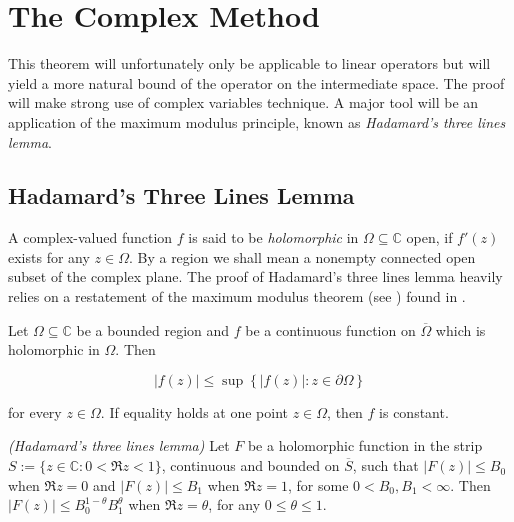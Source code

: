 \section{The Complex Method}
This theorem will unfortunately only be applicable to linear operators but will yield a more natural bound of the operator on the intermediate space. The proof will make strong use of complex variables technique. A major tool will be an application of the maximum modulus principle, known as \emph{Hadamard's three lines lemma}.

\subsection{Hadamard's Three Lines Lemma}
A complex-valued function $f$ is said to be \emph{holomorphic} in $\Omega \subseteq \mathbb{C}$ open, if $f'(z)$ exists for any $z \in \Omega$. By a region we shall mean a nonempty connected open subset of the complex plane. The proof of Hadamard's three lines lemma heavily relies on a restatement of the maximum modulus theorem (see \cite[212]{rudin:rc_analysis:1987}) found in \cite[253]{rudin:rc_analysis:1987}.

\begin{theorem}
	Let $\Omega \subseteq \mathbb{C}$ be a bounded region and $f$ be a continuous function on $\overline{\Omega}$ which is holomorphic in $\Omega$. Then 

	\begin{equation*}
		\left| f(z)\right| \leqslant \sup\left\{ \left|f(z) \right| : z \in \partial\Omega\right\}
	\end{equation*}

	for every $z \in \Omega$. If equality holds at one point $z \in \Omega$, then $f$ is constant.
\end{theorem}

\begin{mdframed}
	\begin{lemma}\emph{(Hadamard's three lines lemma)}
		Let $F$ be a holomorphic function in the strip $S := \{z \in \mathbb{C}: 0 < \Re z < 1\}$, continuous and bounded on $\overline{S}$, such that $\left| F(z)\right| \leqslant B_0$ when $\Re z = 0$ and $\left| F(z) \right| \leqslant B_1$ when $\Re z = 1$, for some $0 < B_0,B_1 < \infty$. Then $\left| F(z) \right| \leqslant B_0^{1 - \theta}B_1^\theta$ when $\Re z = \theta$, for any $0 \leqslant \theta \leqslant 1$.
	\end{lemma}
\end{mdframed}

